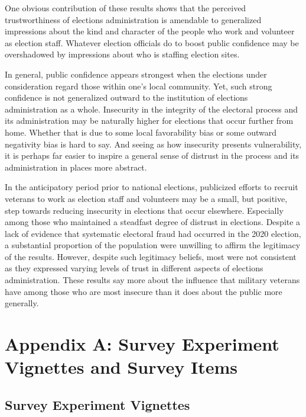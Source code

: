 \documentclass[
  12pt,
  letterpaper,
]{article}
\begin{document}
One obvious contribution of these results shows that the perceived
trustworthiness of elections administration is amendable to generalized
impressions about the kind and character of the people who work and
volunteer as election staff. Whatever election officials do to boost
public confidence may be overshadowed by impressions about who is
staffing election sites.

In general, public confidence appears strongest when the elections under
consideration regard those within one's local community. Yet, such
strong confidence is not generalized outward to the institution of
elections administration as a whole. Insecurity in the integrity of the
electoral process and its administration may be naturally higher for
elections that occur further from home. Whether that is due to some
local favorability bias or some outward negativity bias is hard to say.
And seeing as how insecurity presents vulnerability, it is perhaps far
easier to inspire a general sense of distrust in the process and its
administration in places more abstract.

In the anticipatory period prior to national elections, publicized
efforts to recruit veterans to work as election staff and volunteers may
be a small, but positive, step towards reducing insecurity in elections
that occur elsewhere. Especially among those who maintained a steadfast
degree of distrust in elections. Despite a lack of evidence that
systematic electoral fraud had occurred in the 2020 election, a
substantial proportion of the population were unwilling to affirm the
legitimacy of the results. However, despite such legitimacy beliefs,
most were not consistent as they expressed varying levels of trust in
different aspects of elections administration. These results say more
about the influence that military veterans have among those who are most
insecure than it does about the public more generally.

\newpage{}

\section{Appendix A: Survey Experiment Vignettes and Survey
Items}\label{appendix-a-survey-experiment-vignettes-and-survey-items}

\subsection{Survey Experiment
Vignettes}\label{survey-experiment-vignettes}
\end{document}
